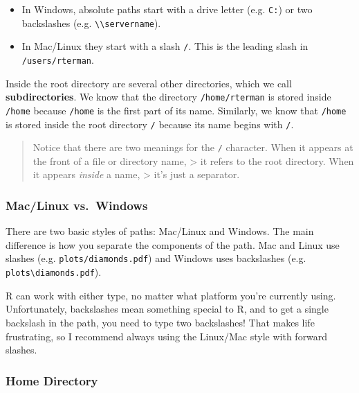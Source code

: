 \documentclass[]{book}
\providecommand{\tightlist}{%
  \setlength{\itemsep}{0pt}\setlength{\parskip}{0pt}}
\begin{document}
\begin{itemize}
\tightlist
\item
  In Windows, absolute paths start with a drive letter (e.g.
  \texttt{C:}) or two backslashes (e.g.
  \texttt{\textbackslash{}\textbackslash{}servername}).
\item
  In Mac/Linux they start with a slash \texttt{/}. This is the leading
  slash in \texttt{/users/rterman}.
\end{itemize}

Inside the root directory are several other directories, which we call
\textbf{subdirectories}. We know that the directory
\texttt{/home/rterman} is stored inside \texttt{/home} because
\texttt{/home} is the first part of its name. Similarly, we know that
\texttt{/home} is stored inside the root directory \texttt{/} because
its name begins with \texttt{/}.

\begin{quote}
Notice that there are two meanings for the \texttt{/} character. When it
appears at the front of a file or directory name, \textgreater{} it
refers to the root directory. When it appears \emph{inside} a name,
\textgreater{} it's just a separator.
\end{quote}

\subsubsection*{Mac/Linux vs.~Windows}\label{maclinux-vs.windows}

There are two basic styles of paths: Mac/Linux and Windows. The main
difference is how you separate the components of the path. Mac and Linux
use slashes (e.g. \texttt{plots/diamonds.pdf}) and Windows uses
backslashes (e.g. \texttt{plots\textbackslash{}diamonds.pdf}).

R can work with either type, no matter what platform you're currently
using. Unfortunately, backslashes mean something special to R, and to
get a single backslash in the path, you need to type two backslashes!
That makes life frustrating, so I recommend always using the Linux/Mac
style with forward slashes.

\subsubsection*{Home Directory}\label{home-directory}
\end{document}
